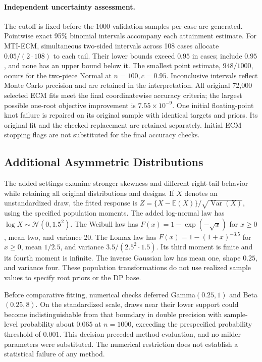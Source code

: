 \documentclass[11pt]{article}
\newcommand{\E}{\mathbb{E}}
\newcommand{\Normal}{\mathcal{N}}
\begin{document}
\paragraph{Independent uncertainty assessment.}
The cutoff is fixed before the 1000 validation samples per case are generated.
Pointwise exact 95\% binomial intervals accompany each attainment estimate.
For MTI-ECM, simultaneous two-sided intervals across 108 cases allocate
\(0.05/(2\cdot108)\) to each tail. Their lower bounds exceed \(0.95\) in
\MTIExpandedECMLower{} cases; \MTIExpandedECMInclude{} include \(0.95\), and
none has an upper bound below it. The smallest point estimate,
\(948/1000\), occurs for the two-piece Normal at \(n=100,c=0.95\).
Inconclusive intervals reflect Monte Carlo precision and are retained in the
interpretation. All original 72,000 selected ECM fits meet the final coordinatewise
accuracy criteria; the largest possible one-root objective improvement is
\(7.55\times10^{-9}\). One initial floating-point knot failure is repaired
on its original sample with identical targets and priors. Its original fit
and the checked replacement are retained separately. Initial ECM stopping
flags are not substituted for the final accuracy checks.

\subsection{Additional Asymmetric Distributions}
\label{sec:supp-mti-added-distributions}

The added settings examine stronger skewness and different right-tail
behavior while retaining all original distributions and designs. If \(X\)
denotes an unstandardized draw, the fitted response is
\(Z=\{X-\E(X)\}/\sqrt{\operatorname{Var}(X)}\), using the specified
population moments. The added log-normal law has
\(\log X\sim\Normal(0,1.5^2)\). The Weibull law has
\(F(x)=1-\exp(-\sqrt{x})\) for \(x\ge0\), mean two, and variance 20.
The Lomax law has \(F(x)=1-(1+x)^{-3.5}\) for \(x\ge0\), mean
\(1/2.5\), and variance \(3.5/(2.5^2\cdot1.5)\). Its third moment is
finite and its fourth moment is infinite. The inverse Gaussian law has
mean one, shape \(0.25\), and variance four. These population transformations
do not use realized sample values to specify root priors or the DP base.

Before comparative fitting, numerical checks deferred Gamma\((0.25,1)\)
and Beta\((0.25,8)\). On the standardized scale, draws near their lower
support could become indistinguishable from that boundary in double
precision with sample-level probability about \(0.065\) at \(n=1000\),
exceeding the prespecified probability threshold of \(0.001\). This decision preceded
method evaluation, and no milder parameters were substituted. The numerical restriction does not establish
a statistical failure of any method.
\end{document}
